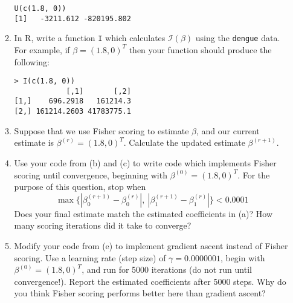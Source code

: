 \documentclass[11pt]{article}
\begin{document}
\begin{enumerate}
\begin{enumerate}
\begin{verbatim}
U(c(1.8, 0))
[1]   -3211.612 -820195.802
\end{verbatim}

\item In R, write a function \texttt{I} which calculates $\mathcal{I}(\beta)$ using the \texttt{dengue} data. For example, if $\beta = (1.8, 0)^T$ then your function should produce the following:

\begin{verbatim}
> I(c(1.8, 0))
            [,1]       [,2]
[1,]    696.2918   161214.3
[2,] 161214.2603 41783775.1
\end{verbatim}

\item Suppose that we use Fisher scoring to estimate $\beta$, and our current estimate is $\beta^{(r)} = (1.8, 0)^T$. Calculate the updated estimate $\beta^{(r+1)}$.

\item Use your code from (b) and (c) to write code which implements Fisher scoring until convergence, beginning with $\beta^{(0)} = (1.8, 0)^T$. For the purpose of this question, stop when 
$$\max \{ |\beta_0^{(r+1)} - \beta_0^{(r)}|, \ |\beta_1^{(r+1)} - \beta_1^{(r)}| \} < 0.0001$$
Does your final estimate match the estimated coefficients in (a)? How many scoring iterations did it take to converge?

\item Modify your code from (e) to implement gradient ascent instead of Fisher scoring. Use a learning rate (step size) of $\gamma = 0.0000001$, begin with $\beta^{(0)} = (1.8, 0)^T$, and run for 5000 iterations (do not run until convergence!). Report the estimated coefficients after 5000 steps. Why do you think Fisher scoring performs better here than gradient ascent?
\end{enumerate}

\end{enumerate}
\end{document}
